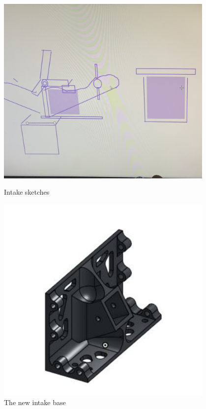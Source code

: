  
\begin{figure}[ht]
\centering
\begin{minipage}[b]{.48\textwidth}
  \centering
  \includegraphics[width=0.95\textwidth]{Meetings/January/01-08-22/1-8-21_CAD_Figure1 - Nathan Forrer.jpg}
  \caption{Intake sketches}
  \label{fig:010822_1}
\end{minipage}%
\hfill%
\begin{minipage}[b]{.48\textwidth}
  \centering
  \includegraphics[width=0.95\textwidth]{Meetings/January/01-08-22/1-8-21_Hardware_Figure2 - Nathan Forrer.JPG}
  \caption{The new intake base}
  \label{fig:010822_2}
\end{minipage}
\end{figure}


